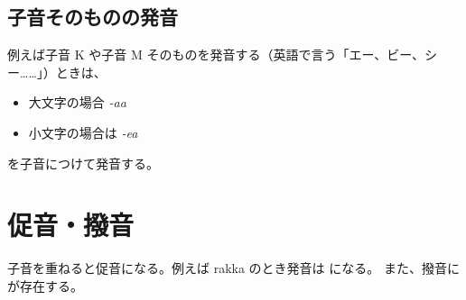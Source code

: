 \subsection{子音そのものの発音}

例えば子音 K や子音 M そのものを発音する（英語で言う「エー、ビー、シー……」）ときは、
\begin{itemize}
    \item 大文字の場合 \emph{-aa}
    \item 小文字の場合は \emph{-ea}
\end{itemize}
を子音につけて発音する。

\section{促音・撥音}

子音を重ねると促音になる。例えば rakka のとき発音は  になる。
また、撥音に  が存在する。